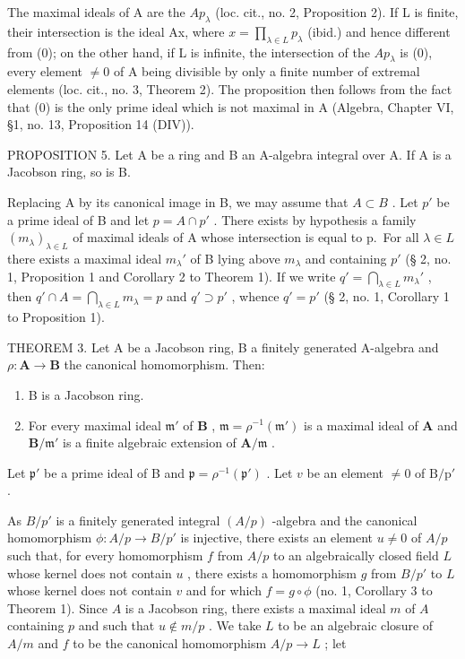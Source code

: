 The maximal ideals of A are the \(Ap_{\lambda}\) (loc. cit., no. 2, Proposition 2). If L is finite, their intersection is the ideal Ax, where \(x = \prod_{\lambda \in L} p_{\lambda}\) (ibid.) and hence different from (0); on the other hand, if L is infinite, the intersection of the \(Ap_{\lambda}\) is (0), every element \(\neq 0\) of A being divisible by only a finite number of extremal elements (loc. cit., no. 3, Theorem 2). The proposition then follows from the fact that (0) is the only prime ideal which is not maximal in A (Algebra, Chapter VI, §1, no. 13, Proposition 14 (DIV)).

PROPOSITION 5. Let A be a ring and B an A-algebra integral over A. If A is a Jacobson ring, so is B.

Replacing A by its canonical image in B, we may assume that \(A \subset B\) . Let \(p'\) be a prime ideal of B and let \(p = A \cap p'\) . There exists by hypothesis a family \((m_{\lambda})_{\lambda \in L}\) of maximal ideals of A whose intersection is equal to p.~For all \(\lambda \in L\) there exists a maximal ideal \(m_{\lambda}'\) of B lying above \(m_{\lambda}\) and containing \(p'\) (§ 2, no. 1, Proposition 1 and Corollary 2 to Theorem 1). If we write \(q' = \bigcap_{\lambda \in L} m_{\lambda}'\) , then \(q' \cap A = \bigcap_{\lambda \in L} m_{\lambda} = p\) and \(q' \supset p'\) , whence \(q' = p'\) (§ 2, no. 1, Corollary 1 to Proposition 1).

THEOREM 3. Let A be a Jacobson ring, B a finitely generated A-algebra and \(\rho: \mathbf{A} \to \mathbf{B}\) the canonical homomorphism. Then:

\begin{enumerate}
\def\labelenumi{(\roman{enumi})}
\item
  B is a Jacobson ring.
\item
  For every maximal ideal \(\mathfrak{m}'\) of \(\mathbf{B}\) , \(\mathfrak{m} = \rho^{-1} (\mathfrak{m}')\) is a maximal ideal of \(\mathbf{A}\) and \(\mathbf{B} / \mathfrak{m}'\) is a finite algebraic extension of \(\mathbf{A} / \mathfrak{m}\) .
\end{enumerate}

Let \(\mathfrak{p}'\) be a prime ideal of B and \(\mathfrak{p} = \rho^{-1} (\mathfrak{p}')\) . Let \(v\) be an element \(\neq 0\) of \(\mathrm{B / p'}\) .

As \(B/p'\) is a finitely generated integral \((A/p)\) -algebra and the canonical homomorphism \(\phi: A/p \to B/p'\) is injective, there exists an element \(u \neq 0\) of \(A/p\) such that, for every homomorphism \(f\) from \(A/p\) to an algebraically closed field \(L\) whose kernel does not contain \(u\) , there exists a homomorphism \(g\) from \(B/p'\) to \(L\) whose kernel does not contain \(v\) and for which \(f = g \circ \phi\) (no. 1, Corollary 3 to Theorem 1). Since \(A\) is a Jacobson ring, there exists a maximal ideal \(m\) of \(A\) containing \(p\) and such that \(u \notin m/p\) . We take \(L\) to be an algebraic closure of \(A/m\) and \(f\) to be the canonical homomorphism \(A/p \to L\) ; let

